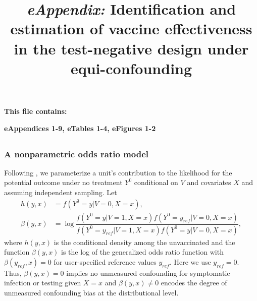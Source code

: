 
\title{\textit{eAppendix:} Identification and estimation of vaccine effectiveness in the test-negative design under equi-confounding}
\date{ }
\maketitle
{}%

\textbf{This file contains:}

\textbf{eAppendices 1-9, eTables 1-4, eFigures 1-2}
\newpage 
\begin{appendix}
    \renewcommand{\thesection}{eAppendix \arabic{section}}
    \renewcommand{\thesubsection}{\arabic{section}.\arabic{subsection}}
    
    \renewcommand{\figurename}{eFigure}
    \setcounter{figure}{0}

    \renewcommand{\tablename}{eTable}
    \setcounter{table}{0}
    
    \renewcommand{\theequation}{A\arabic{equation}}
    \setcounter{equation}{0}

    \singlespacing
     \part{ } %
    \parttoc %

    \newpage
    \begin{refsection}  

    \section{A nonparametric odds ratio model}\label{sec:or_model}
Following \textcite{tchetgen_universal_2023}, we parameterize a unit's contribution to the likelihood for the potential outcome under no treatment $Y^0$ conditional on $V$ and covariates $X$ and assuming independent sampling. Let
\begin{align*}
    h(y, x) &= f(Y^0 = y | V = 0, X = x), \\
    \beta(y,  x) &= \log \dfrac{f(Y^0 = y | V = 1, X = x)f(Y^0 = y_{ref} | V = 0, X = x)}{f(Y^0 = y_{ref} | V = 1, X = x)f(Y^0 = y | V = 0, X = x)},
\end{align*}
where $h(y, x) $ is the conditional density among the unvaccinated and the function $ \beta(y,  x)$ is the log of the generalized odds ratio function with $\beta(y_{ref},  x) = 0$ for user-specified reference values $y_{ref}$. Here we use $y_{ref} = 0$. Thus, $\beta(y,  x) = 0$ implies no unmeasured confounding for symptomatic infection or testing given $X = x$ and $\beta(y,  x) \neq 0$ encodes the degree of unmeasured confounding bias at the distributional level. 


\end{refsection}
\end{appendix}
